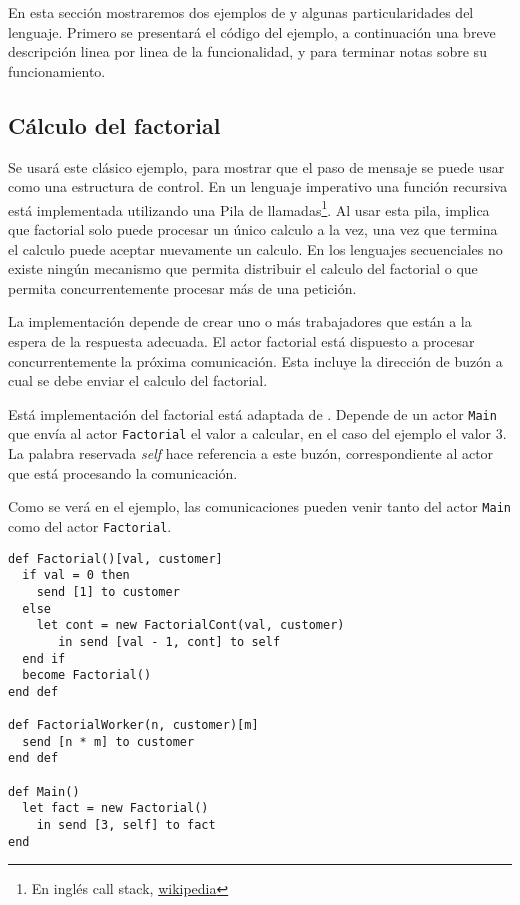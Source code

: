 En esta sección mostraremos dos ejemplos de \SAL y algunas particularidades del lenguaje. Primero se presentará el código del ejemplo, a continuación una breve descripción linea por linea de la funcionalidad, y para terminar notas sobre su funcionamiento.

\subsection{Cálculo del factorial}\label{sal:factorial}

Se usará este clásico ejemplo, para mostrar que el paso de mensaje se puede usar como una estructura de control. En un lenguaje imperativo una función recursiva está implementada utilizando una Pila de llamadas\footnote{En inglés call stack, \href{https://es.wikipedia.org/wiki/Pila_de_llamadas}{wikipedia}}. Al usar esta pila, implica que factorial solo puede procesar un único calculo a la vez, una vez que termina el calculo puede aceptar nuevamente un calculo. En los lenguajes secuenciales no existe ningún mecanismo que permita distribuir el calculo del factorial o que permita concurrentemente procesar más de una petición.

La implementación depende de crear uno o más trabajadores que están a la espera de la respuesta adecuada. El actor factorial está dispuesto a procesar concurrentemente la próxima comunicación. Esta incluye la dirección de buzón a cual se debe enviar el calculo del factorial.

Está implementación del factorial está adaptada de \cite{Agha:1986:AMC:7929}. Depende de un actor \lstinline[language=sal, style=simple]$Main$ que envía al actor \lstinline[language=sal, style=simple]$Factorial$ el valor a calcular, en el caso del ejemplo el valor $3$. La palabra reservada \textit{self} hace referencia a este buzón, correspondiente al actor que está procesando la comunicación.

Como se verá en el ejemplo, las comunicaciones pueden venir tanto del actor \lstinline[language=sal, style=simple]$Main$ como del actor \lstinline[language=sal, style=simple]$Factorial$.

\begin{lstlisting}[language=sal, style=simple]
def Factorial()[val, customer]
  if val = 0 then
    send [1] to customer
  else
    let cont = new FactorialCont(val, customer)
       in send [val - 1, cont] to self
  end if 
  become Factorial()
end def

def FactorialWorker(n, customer)[m] 
  send [n * m] to customer
end def

def Main() 
  let fact = new Factorial() 
    in send [3, self] to fact
end
\end{lstlisting}

